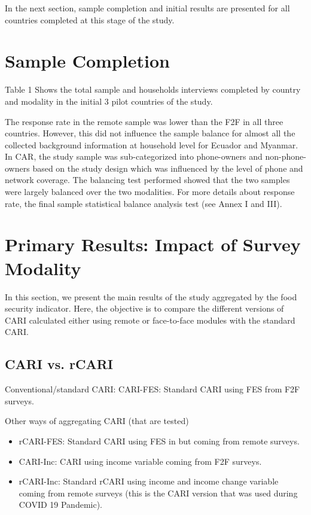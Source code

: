 \documentclass[11pt,harvard]{article}
\begin{document}
In the next section, sample completion and initial results are presented for all countries completed at this stage of the study.

\pagebreak
	
\section{Sample Completion}

Table 1 Shows the total sample and households interviews completed by country and modality in the initial 3 pilot countries of the study.

 
\label{tab:rCARI_Overall_Completion}

The response rate in the remote sample was lower than the F2F in all three countries. However, this did not influence the sample balance for almost all the collected background information at household level for Ecuador and Myanmar. 
In CAR, the study sample was sub-categorized into phone-owners and non-phone-owners based on the study design which was influenced by the level of phone and network coverage. The balancing test performed showed that the two samples were largely balanced over the two modalities. For more details about response rate, the final sample statistical balance analysis test (see Annex I and III).


\pagebreak

\section{Primary Results: Impact of Survey Modality}

In this section, we present the main results of the study aggregated by the food security indicator. Here, the objective is to compare the different versions of CARI calculated either using remote or face-to-face modules with the standard CARI.

\subsection{CARI vs. rCARI}
Conventional/standard CARI:  CARI-FES: Standard CARI using FES from F2F surveys.

Other ways of aggregating CARI (that are tested)
\begin{itemize}[label=--, left=1.5em]
	\item rCARI-FES: Standard CARI using FES in but coming from remote surveys.
	\item CARI-Inc: CARI using income variable coming from F2F surveys.
	\item rCARI-Inc: Standard rCARI using income and income change variable coming from remote surveys (this is the CARI version that was used during COVID 19 Pandemic).
\end{itemize}
\end{document}
